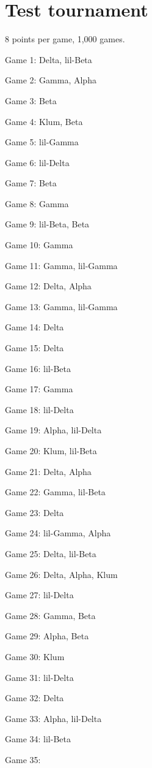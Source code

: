 \documentclass{article}
\begin{document}
\section{Test tournament}
8 points per game, 1,000 games.
\begin{multicols}{3}\raggedcolumns
\begin{compactitem}
\item Game 1:
Delta, lil-Beta
\item Game 2:
Gamma, Alpha
\item Game 3:
Beta
\item Game 4:
Klum, Beta
\item Game 5:
lil-Gamma
\item Game 6:
lil-Delta
\item Game 7:
Beta
\item Game 8:
Gamma
\item Game 9:
lil-Beta, Beta
\item Game 10:
Gamma
\item Game 11:
Gamma, lil-Gamma
\item Game 12:
Delta, Alpha
\item Game 13:
Gamma, lil-Gamma
\item Game 14:
Delta
\item Game 15:
Delta
\item Game 16:
lil-Beta
\item Game 17:
Gamma
\item Game 18:
lil-Delta
\item Game 19:
Alpha, lil-Delta
\item Game 20:
Klum, lil-Beta
\item Game 21:
Delta, Alpha
\item Game 22:
Gamma, lil-Beta
\item Game 23:
Delta
\item Game 24:
lil-Gamma, Alpha
\item Game 25:
Delta, lil-Beta
\item Game 26:
Delta, Alpha, Klum
\item Game 27:
lil-Delta
\item Game 28:
Gamma, Beta
\item Game 29:
Alpha, Beta
\item Game 30:
Klum
\item Game 31:
lil-Delta
\item Game 32:
Delta
\item Game 33:
Alpha, lil-Delta
\item Game 34:
lil-Beta
\item Game 35:

\end{compactitem}
\end{multicols}
\end{document}

